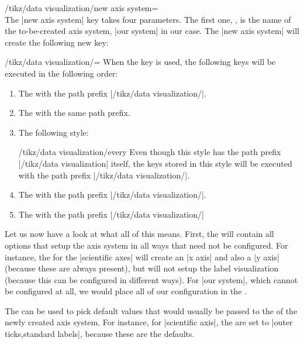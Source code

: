 \begin{key}{/tikz/data visualization/new axis system=\\ %
}
    The |new axis system| key takes four parameters. The first one, , is the name of the to-be-created axis system, |our system| in our case. The |new axis system| will create the following new key:
    \begin{key}{/tikz/data visualization/=}
        When the key  is used, the following keys will be executed in the following order:
        \begin{enumerate}
            \item The  with the path prefix
                |/tikz/data visualization/|.
            \item The  with the same path prefix.
            \item The following style:
                \begin{stylekey}{/tikz/data visualization/every }
                    Even though this style has the path prefix |/tikz/data visualization| itself, the keys stored in this style will be executed with the path prefix |/tikz/data visualization/|.
                \end{stylekey}
            \item The  with the path prefix |/tikz/data visualization/|.
            \item The  with the path prefix |/tikz/data visualization/|
        \end{enumerate}
    \end{key}

    Let us now have a look at what all of this means. First, the  will contain all options that setup the axis system in all ways that need not be configured. For instance, the  for the |scientific axes| will create an |x axis| and also a |y axis| (because these are always present), but will not setup the label visualization (because this can be configured in different ways). For |our system|, which cannot be configured at all, we would place all of our configuration in the .

    The  can be used to pick default values that would usually be passed to the  of the newly created axis system. For instance, for |scientific axis|, the  are set to |outer ticks,standard labels|, because these are the defaults.


\end{key}
